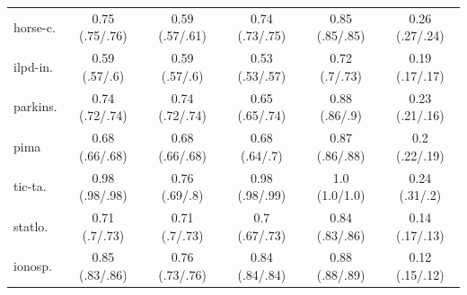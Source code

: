 \begin{table}[t]
\begin{tabular}{lccccc}
        horse-c.       & 0.75 (.75/.76)   & 0.59 (.57/.61) & 0.74 (.73/.75) & 0.85 (.85/.85) & 0.26 (.27/.24)   \\
        ilpd-in. & 0.59 (.57/.6)    & 0.59 (.57/.6)  & 0.53 (.53/.57) & 0.72 (.7/.73)  & 0.19 (.17/.17)   \\
        parkins.        & 0.74 (.72/.74)   & 0.74 (.72/.74) & 0.65 (.65/.74) & 0.88 (.86/.9)  & 0.23 (.21/.16)   \\
        pima              & 0.68 (.66/.68)   & 0.68 (.66/.68) & 0.68 (.64/.7)  & 0.87 (.86/.88) & 0.2 (.22/.19)    \\
        tic-ta.       & 0.98 (.98/.98)   & 0.76 (.69/.8)  & 0.98 (.98/.99) & 1.0 (1.0/1.0)    & 0.24 (.31/.2)    \\
        statlo.     & 0.71 (.7/.73)    & 0.71 (.7/.73)  & 0.7 (.67/.73)  & 0.84 (.83/.86) & 0.14 (.17/.13)   \\
        ionosp.        & 0.85 (.83/.86)   & 0.76 (.73/.76) & 0.84 (.84/.84) & 0.88 (.88/.89) & 0.12 (.15/.12)   \\
        \bottomrule
    \end{tabular}
\end{table}

\setlength{\tabcolsep}{6pt} %
